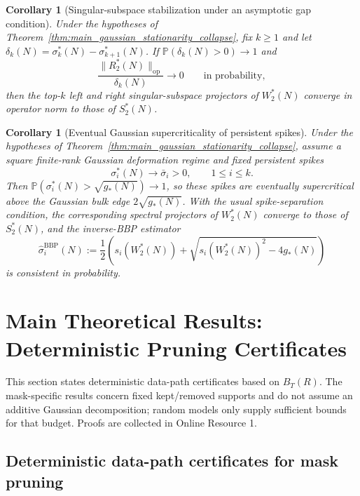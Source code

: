 \documentclass[11pt]{article}
\theoremstyle{plain}
\newtheorem{cor}[thm]{Corollary}
\theoremstyle{definition}
\theoremstyle{remark}
\newcommand{\PP}{\mathbb{P}}
\newcommand{\op}{\mathrm{op}}
\newcommand{\1}{\mathbf{1}}
\begin{document}
\begin{cor}[Singular-subspace stabilization under an asymptotic gap condition]
\label{cor:main_subspace_stabilization}
Under the hypotheses of Theorem~\ref{thm:main_gaussian_stationarity_collapse}, fix \(k\ge1\) and let \(\delta_k(N)=\sigma_k^*(N)-\sigma_{k+1}^*(N)\). If \(\PP(\delta_k(N)>0)\to1\) and
\[
\frac{\|R_2^*(N)\|_{\op}}{\delta_k(N)}\to0
\qquad\text{in probability},
\]
then the top-\(k\) left and right singular-subspace projectors of \(W_2^*(N)\) converge in operator norm to those of \(S_2^*(N)\).
\end{cor}

\begin{cor}[Eventual Gaussian supercriticality of persistent spikes]
\label{cor:main_gaussian_BBP_persistent_spikes}
Under the hypotheses of Theorem~\ref{thm:main_gaussian_stationarity_collapse}, assume a square finite-rank Gaussian deformation regime and fixed persistent spikes
\[
\sigma_i^*(N)\to\bar\sigma_i>0,
\qquad 1\le i\le k.
\]
Then \(\PP(\sigma_i^*(N)>\sqrt{g_*(N)})\to1\), so these spikes are eventually supercritical above the Gaussian bulk edge \(2\sqrt{g_*(N)}\). With the usual spike-separation condition, the corresponding spectral projectors of \(W_2^*(N)\) converge to those of \(S_2^*(N)\), and the inverse-BBP estimator
\[
\widehat\sigma_i^{\mathrm{BBP}}(N)
:=
\frac12\left(s_i(W_2^*(N))+
\sqrt{s_i(W_2^*(N))^2-4g_*(N)}\right)
\]
is consistent in probability.
\end{cor}

\FloatBarrier
\section{Main Theoretical Results: Deterministic Pruning Certificates}
\label{Main_theory_gen}

This section states deterministic data-path certificates based on \(B_T(R)\). The mask-specific results concern fixed kept/removed supports and do not assume an additive Gaussian decomposition; random models only supply sufficient bounds for that budget. Proofs are collected in Online Resource 1.

\subsection{Deterministic data-path certificates for mask pruning}
\label{subsec:deterministic_mask_certificate}
\end{document}
